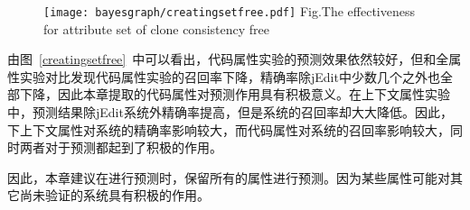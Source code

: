 \begin{figure}[h]
\centering
\texttt{[image: bayesgraph/creatingsetfree.pdf]}
{Fig.$\!$}{The effectiveness for attribute set of clone consistency free}
\vspace{-1em}
\end{figure}

由图~\ref{creatingsetfree}~中可以看出，代码属性实验的预测效果依然较好，但和全属性实验对比发现代码属性实验的召回率下降，精确率除jEdit中少数几个之外也全部下降，因此本章提取的代码属性对预测作用具有积极意义。在上下文属性实验中，预测结果除jEdit系统外精确率提高，但是系统的召回率却大大降低。因此，下上下文属性对系统的精确率影响较大，而代码属性对系统的召回率影响较大，同时两者对于预测都起到了积极的作用。

因此，本章建议在进行预测时，保留所有的属性进行预测。因为某些属性可能对其它尚未验证的系统具有积极的作用。

